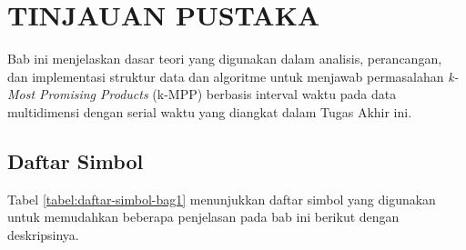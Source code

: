 
\chapter{TINJAUAN PUSTAKA} \label{chapter:tinjauan pustaka}
\tab Bab ini menjelaskan dasar teori yang digunakan dalam analisis, perancangan, dan implementasi struktur data dan algoritme untuk menjawab permasalahan \textit{k-Most Promising Products} (k-MPP) berbasis interval waktu pada data multidimensi dengan serial waktu yang diangkat dalam Tugas Akhir ini. 

\section{Daftar Simbol}
\tab Tabel \ref{tabel:daftar-simbol-bag1} menunjukkan daftar simbol yang digunakan untuk memudahkan beberapa penjelasan pada bab ini berikut dengan deskripsinya.

